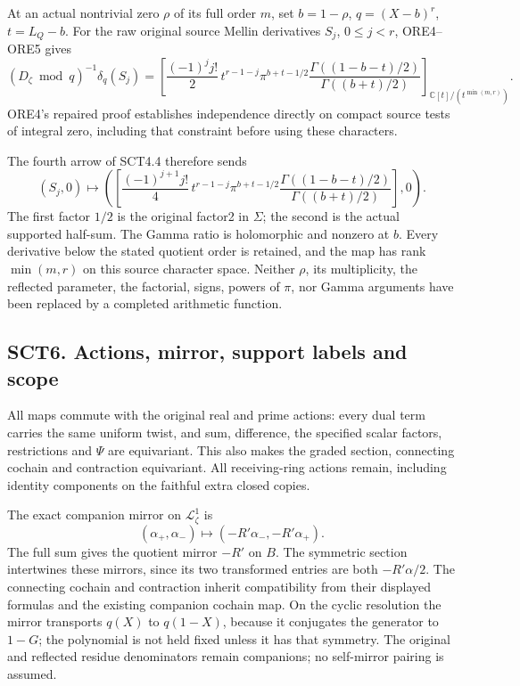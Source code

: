 At an actual nontrivial zero \(\rho\) of its full order \(m\), set
\(b=1-\rho\), \(q=(X-b)^r\), \(t=L_Q-b\). For the raw original source
Mellin derivatives \(S_j\), \(0\le j<r\), ORE4--ORE5 gives \[
(D_\zeta\bmod q)^{-1}\delta_q(S_j)
=\left[
\frac{(-1)^j j!}{2}\,t^{r-1-j}
\pi^{b+t-1/2}
\frac{\Gamma((1-b-t)/2)}{\Gamma((b+t)/2)}
\right]_{\mathbb C[t]/(t^{\min(m,r)})}.
\tag{SCT5.1}
\] ORE4's repaired proof establishes independence directly on compact
source tests of integral zero, including that constraint before using
these characters.

The fourth arrow of SCT4.4 therefore sends \[
\boxed{
(S_j,0)\longmapsto
\left(
\left[
\frac{(-1)^{j+1}j!}{4}\,t^{r-1-j}
\pi^{b+t-1/2}
\frac{\Gamma((1-b-t)/2)}{\Gamma((b+t)/2)}
\right],0\right).}
\tag{SCT5.2}
\] The first factor \(1/2\) is the original factor2 in \(\Sigma\); the
second is the actual supported half-sum. The Gamma ratio is holomorphic
and nonzero at \(b\). Every derivative below the stated quotient order
is retained, and the map has rank \(\min(m,r)\) on this source character
space. Neither \(\rho\), its multiplicity, the reflected parameter, the
factorial, signs, powers of \(\pi\), nor Gamma arguments have been
replaced by a completed arithmetic function.

\subsection{SCT6. Actions, mirror, support labels and
scope}\label{sct6.-actions-mirror-support-labels-and-scope}

All maps commute with the original real and prime actions: every dual
term carries the same uniform twist, and sum, difference, the specified
scalar factors, restrictions and \(\Psi\) are equivariant. This also
makes the graded section, connecting cochain and contraction
equivariant. All receiving-ring actions remain, including identity
components on the faithful extra closed copies.

The exact companion mirror on \(\mathcal L_\zeta^1\) is \[
(\alpha_+,\alpha_-)\longmapsto(-R'\alpha_-,-R'\alpha_+).
\] The full sum gives the quotient mirror \(-R'\) on \(B\). The
symmetric section intertwines these mirrors, since its two transformed
entries are both \(-R'\alpha/2\). The connecting cochain and contraction
inherit compatibility from their displayed formulas and the existing
companion cochain map. On the cyclic resolution the mirror transports
\(q(X)\) to \(q(1-X)\), because it conjugates the generator to \(1-G\);
the polynomial is not held fixed unless it has that symmetry. The
original and reflected residue denominators remain companions; no
self-mirror pairing is assumed.

